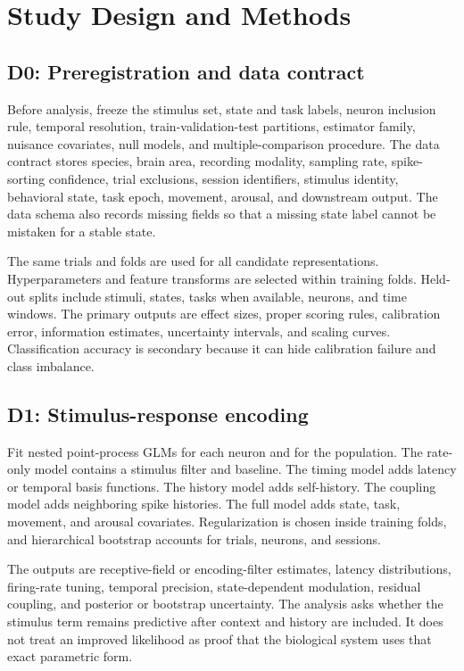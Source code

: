 \documentclass[conference]{IEEEtran}
\begin{document}
\section{Study Design and Methods}
\subsection{D0: Preregistration and data contract}
Before analysis, freeze the stimulus set, state and task labels, neuron inclusion rule, temporal resolution, train-validation-test partitions, estimator family, nuisance covariates, null models, and multiple-comparison procedure. The data contract stores species, brain area, recording modality, sampling rate, spike-sorting confidence, trial exclusions, session identifiers, stimulus identity, behavioral state, task epoch, movement, arousal, and downstream output. The data schema also records missing fields so that a missing state label cannot be mistaken for a stable state.

The same trials and folds are used for all candidate representations. Hyperparameters and feature transforms are selected within training folds. Held-out splits include stimuli, states, tasks when available, neurons, and time windows. The primary outputs are effect sizes, proper scoring rules, calibration error, information estimates, uncertainty intervals, and scaling curves. Classification accuracy is secondary because it can hide calibration failure and class imbalance.

\subsection{D1: Stimulus-response encoding}
Fit nested point-process GLMs for each neuron and for the population. The rate-only model contains a stimulus filter and baseline. The timing model adds latency or temporal basis functions. The history model adds self-history. The coupling model adds neighboring spike histories. The full model adds state, task, movement, and arousal covariates. Regularization is chosen inside training folds, and hierarchical bootstrap accounts for trials, neurons, and sessions.

The outputs are receptive-field or encoding-filter estimates, latency distributions, firing-rate tuning, temporal precision, state-dependent modulation, residual coupling, and posterior or bootstrap uncertainty. The analysis asks whether the stimulus term remains predictive after context and history are included. It does not treat an improved likelihood as proof that the biological system uses that exact parametric form.
\end{document}
